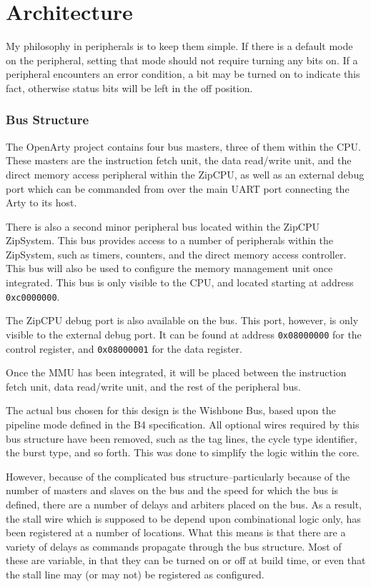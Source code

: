 \documentclass{gqtekspec}
\begin{document}
\chapter{Architecture}\label{ch:architecture}
My philosophy in peripherals is to keep them simple.  If there is a default
mode on the peripheral, setting that mode should not require turning any bits
on.  If a peripheral encounters an error condition, a bit may be turned on to
indicate this fact, otherwise status bits will be left in the off position.

\subsection{Bus Structure}
The OpenArty project contains four bus masters, three of them within the CPU.
These masters are the instruction fetch unit, the data read/write unit,
and the direct memory access peripheral within the ZipCPU, as well as an 
external debug port which can be commanded from over the main UART port
connecting the Arty to its host.  

There is also a second minor peripheral bus located within the ZipCPU
ZipSystem.  This bus provides access to a number of peripherals within the
ZipSystem, such as timers, counters, and the direct memory access controller.
This bus will also be used to configure the memory management unit once
integrated.  This bus is only visible to the CPU, and located starting at
address {\tt 0xc0000000}.

The ZipCPU debug port is also available on the bus.  This port, however, is
only visible to the external debug port.  It can be found at address
{\tt 0x08000000} for the control register, and {\tt 0x08000001} for the
data register.

Once the MMU has been integrated, it will be placed between the instruction
fetch unit, data read/write unit, and the rest of the peripheral bus.

The actual bus chosen for this design is the Wishbone Bus, based upon the
pipeline mode defined in the B4 specification.  All optional wires required
by this bus structure have been removed, such as the tag lines, the cycle
type identifier, the burst type, and so forth.  This was done to simplify
the logic within the core.

However, because of the complicated bus structure--particularly because of the
number of masters and slaves on the bus and the speed for which the bus is
defined, there are a number of delays and arbiters placed on the bus.  As a
result, the stall wire which is supposed to be depend upon combinational logic
only, has been registered at a number of locations.  What this means is that
there are a variety of delays as commands propagate through the bus structure.
Most of these are variable, in that they can be turned on or off at build time,
or even that the stall line may (or may not) be registered as configured.
\end{document}
